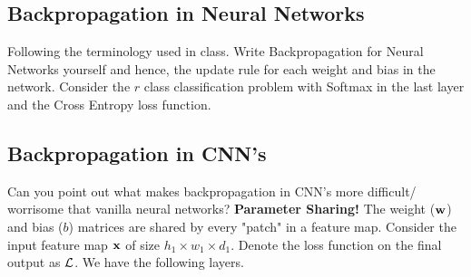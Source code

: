 \subsection{Backpropagation in Neural Networks}
Following the terminology used in class. Write Backpropagation for Neural Networks yourself and hence, the update rule for each weight and bias in the network. Consider the $r$ class classification problem with Softmax in the last layer and the Cross Entropy loss function.

\subsection{Backpropagation in CNN's}
Can you point out what makes backpropagation in CNN's more difficult/ worrisome that vanilla neural networks? \textbf{Parameter Sharing!} The weight ($\mathbf{w}$) and bias ($b$) matrices are shared by every "patch" in a feature map. Consider the input feature map $\mathbf{x}$ of size $h_1 \times w_1 \times d_1$. Denote the loss function on the final output as $\mathcal{L}$. We have the following layers. 
